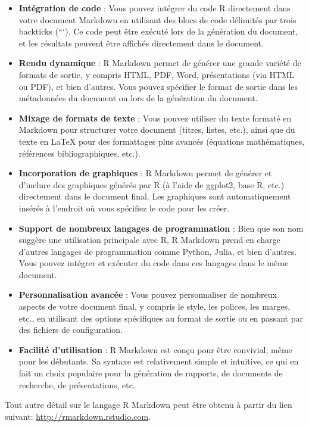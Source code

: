 \documentclass[
  12pt,
]{article}
\begin{document}
\begin{itemize}
\item
  \textbf{Intégration de code} : Vous pouvez intégrer du code R
  directement dans votre document Markdown en utilisant des blocs de
  code délimités par trois backticks (```). Ce code peut être exécuté
  lors de la génération du document, et les résultats peuvent être
  affichés directement dans le document.
\item
  \textbf{Rendu dynamique} : R Markdown permet de générer une grande
  variété de formats de sortie, y compris HTML, PDF, Word, présentations
  (via HTML ou PDF), et bien d'autres. Vous pouvez spécifier le format
  de sortie dans les métadonnées du document ou lors de la génération du
  document.
\item
  \textbf{Mixage de formats de texte} : Vous pouvez utiliser du texte
  formaté en Markdown pour structurer votre document (titres, listes,
  etc.), ainsi que du texte en LaTeX pour des formattages plus avancés
  (équations mathématiques, références bibliographiques, etc.).
\item
  \textbf{Incorporation de graphiques} : R Markdown permet de générer et
  d'inclure des graphiques générés par R (à l'aide de ggplot2, base R,
  etc.) directement dans le document final. Les graphiques sont
  automatiquement insérés à l'endroit où vous spécifiez le code pour les
  créer.
\item
  \textbf{Support de nombreux langages de programmation} : Bien que son
  nom suggère une utilisation principale avec R, R Markdown prend en
  charge d'autres langages de programmation comme Python, Julia, et bien
  d'autres. Vous pouvez intégrer et exécuter du code dans ces langages
  dans le même document.
\item
  \textbf{Personnalisation avancée} : Vous pouvez personnaliser de
  nombreux aspects de votre document final, y compris le style, les
  polices, les marges, etc., en utilisant des options spécifiques au
  format de sortie ou en passant par des fichiers de configuration.
\item
  \textbf{Facilité d'utilisation} : R Markdown est conçu pour être
  convivial, même pour les débutants. Sa syntaxe est relativement simple
  et intuitive, ce qui en fait un choix populaire pour la génération de
  rapports, de documents de recherche, de présentations, etc.
\end{itemize}

Tout autre détail sur le langage R Markdown peut être obtenu à partir du
lien suivant: \url{http://rmarkdown.rstudio.com}.
\end{document}
